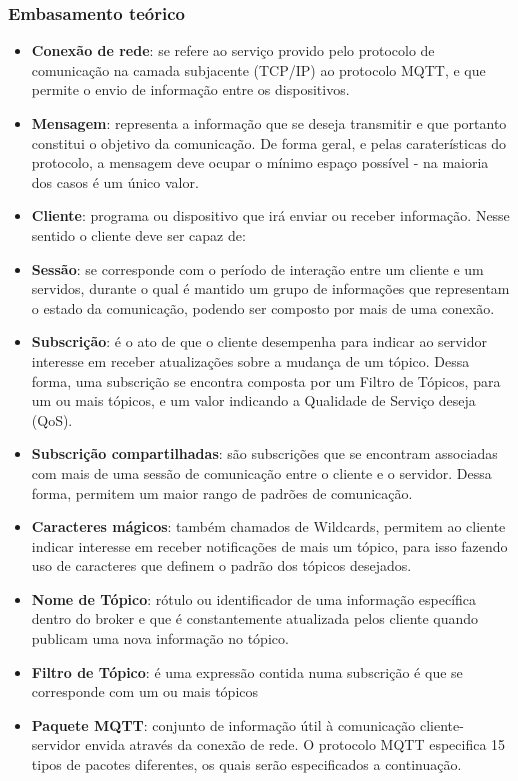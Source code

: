 \documentclass[12pt]{beamer}
\begin{document}
\begin{frame}[allowframebreaks]
    \frametitle{Embasamento teórico}
    \begin{itemize}
    		\item \textbf{Conexão de rede}: se refere ao serviço provido pelo protocolo de comunicação na camada subjacente (TCP/IP) ao protocolo MQTT, e que permite o envio de informação entre os dispositivos.
    		\item \textbf{Mensagem}: representa a informação que se deseja transmitir e que portanto constitui o objetivo da comunicação. De forma geral, e pelas caraterísticas do protocolo, a mensagem deve ocupar o mínimo espaço possível - na maioria dos casos é um único valor.
    		\item \textbf{Cliente}: programa ou dispositivo que irá enviar ou receber informação. Nesse sentido o cliente deve ser capaz de:
    		\item \textbf{Sessão}: se corresponde com o período de interação entre um cliente e um servidos, durante o qual é mantido um grupo de informações que representam o estado da comunicação, podendo ser composto por mais de uma conexão.
    		\item \textbf{Subscrição}: é o ato de que o cliente desempenha para indicar ao servidor interesse em receber atualizações sobre a mudança de um tópico. Dessa forma, uma subscrição se encontra composta por um Filtro de Tópicos, para um ou mais tópicos, e um valor indicando a Qualidade de Serviço deseja (QoS).
    		\item \textbf{Subscrição compartilhadas}: são subscrições que se encontram associadas com mais de uma sessão de comunicação entre o cliente e o servidor. Dessa forma, permitem um maior rango de padrões de comunicação.
    		\item \textbf{Caracteres mágicos}: também chamados de Wildcards, permitem ao cliente indicar interesse em receber notificações de mais um tópico, para isso fazendo uso de caracteres que definem o padrão dos tópicos desejados.
    		\item \textbf{Nome de Tópico}: rótulo ou identificador de uma informação específica dentro do broker e que é constantemente atualizada pelos cliente quando publicam uma nova informação no tópico.
    		\item \textbf{Filtro de Tópico}: é uma expressão contida numa subscrição é que se corresponde com um ou mais tópicos
    		\item \textbf{Paquete MQTT}: conjunto de informação útil à comunicação cliente-servidor envida através da conexão de rede. O protocolo MQTT especifica 15 tipos de pacotes diferentes, os quais serão especificados a continuação.
    \end{itemize}
    
\end{frame}
\end{document}
